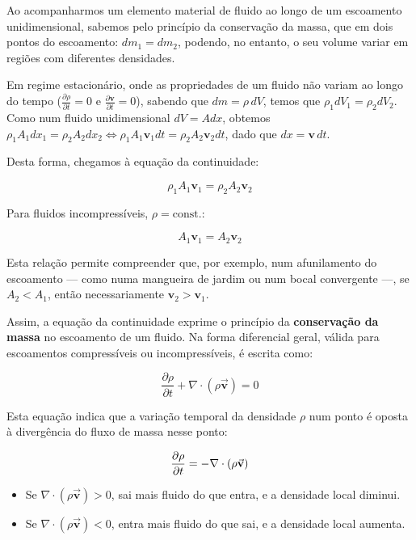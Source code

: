 Ao acompanharmos um elemento material de fluido ao longo de um escoamento unidimensional, sabemos pelo princípio da conservação da massa, que em dois pontos do escoamento: $d m_1 = d m_2$, podendo, no entanto, o seu volume variar em regiões com diferentes densidades.

Em regime estacionário, onde as propriedades de um fluido não variam ao longo do tempo ($\frac{\partial \rho}{\partial t} = 0$ e $\frac{\partial \mathbf{v}}{\partial t} = 0$), sabendo que $dm = \rho \,dV$, temos que $\rho_1 dV_1 = \rho_2 dV_2$. Como num fluido unidimensional $dV = A dx$, obtemos $\rho_1 A_1 dx_1 = \rho_2 A_2 dx_2 \Longleftrightarrow \rho_1 A_1 \mathbf{v}_1 dt = \rho_2 A_2 \mathbf{v}_2 dt$, dado que $dx = \mathbf{v} \, dt$.

Desta forma, chegamos à equação da continuidade:

\begin{equation}
    \rho_1 A_1 \mathbf{v}_1= \rho_2 A_2 \mathbf{v}_2
\end{equation}

Para fluidos incompressíveis, $\rho = \text{const.}$:

\begin{equation}
    A_1 \mathbf{v}_1= A_2 \mathbf{v}_2
\end{equation}

Esta relação permite compreender que, por exemplo, num afunilamento do escoamento — como numa mangueira de jardim ou num bocal convergente —, se $A_2 < A_1$, então necessariamente $\mathbf{v}_2 > \mathbf{v}_1$.

Assim, a equação da continuidade exprime o princípio da \textbf{conservação da massa} no escoamento de um fluido. Na forma diferencial geral, válida para escoamentos compressíveis ou incompressíveis, é escrita como:

\begin{equation}
    \frac{\partial \rho}{\partial t} + \nabla \cdot (\rho \vec{\mathbf{v}}) = 0
\end{equation}

Esta equação indica que a variação temporal da densidade \(\rho\) num ponto é oposta à divergência do fluxo de massa nesse ponto:

\begin{equation} \notag
    \frac{\partial \rho}{\partial t} = - \nabla \cdot (\rho \vec{\mathbf{v}})
\end{equation} 

\begin{itemize}
    \item Se \(\nabla \cdot (\rho \vec{\mathbf{v}}) > 0\), sai mais fluido do que entra, e a densidade local diminui.
    \item Se \(\nabla \cdot (\rho \vec{\mathbf{v}}) < 0\), entra mais fluido do que sai, e a densidade local aumenta.
\end{itemize}

